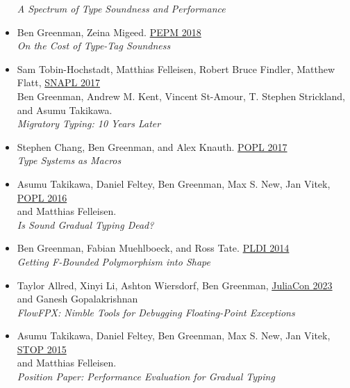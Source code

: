 \documentclass[11pt]{article}
\begin{document}
\begin{itemize}
  \emph{A Spectrum of Type Soundness and Performance}
\item
  Ben Greenman, Zeina Migeed. \hfill \href{https://popl18.sigplan.org/track/PEPM-2018}{PEPM 2018} \\
  \emph{On the Cost of Type-Tag Soundness}
\item
  Sam Tobin-Hochstadt, Matthias Felleisen, Robert Bruce Findler, Matthew Flatt, \hfill \href{https://snapl.org/2017/}{SNAPL 2017} \\
  Ben Greenman, Andrew M. Kent, Vincent St-Amour, T. Stephen Strickland, \\
  and Asumu Takikawa. \\
  \emph{Migratory Typing: 10 Years Later}
\item
  Stephen Chang, Ben Greenman, and Alex Knauth. \hfill \href{https://popl17.sigplan.org/}{POPL 2017} \\
   \emph{Type Systems as Macros}
\item
  Asumu Takikawa, Daniel Feltey, Ben Greenman, Max S. New, Jan Vitek, \hfill \href{https://popl16.sigplan.org/}{POPL 2016} \\
   and Matthias Felleisen. \\
   \emph{Is Sound Gradual Typing Dead?}
\item
  Ben Greenman, Fabian Muehlboeck, and Ross Tate. \hfill \href{https://conferences.inf.ed.ac.uk/pldi2014/}{PLDI 2014} \\
  \emph{Getting F-Bounded Polymorphism into Shape}
\end{itemize}

\begin{itemize}
\item
  Taylor Allred, Xinyi Li, Ashton Wiersdorf, Ben Greenman, \hfill \href{https://juliacon.org/2023/}{JuliaCon 2023} \\
   and Ganesh Gopalakrishnan  \\
   \emph{FlowFPX: Nimble Tools for Debugging Floating-Point Exceptions}
\item
  Asumu Takikawa, Daniel Feltey, Ben Greenman, Max S. New, Jan Vitek, \hfill \href{https://2015.ecoop.org/track/STOP2015}{STOP 2015} \\
   and Matthias Felleisen. \\
   \emph{Position Paper: Performance Evaluation for Gradual Typing}
\end{itemize}
\end{document}
